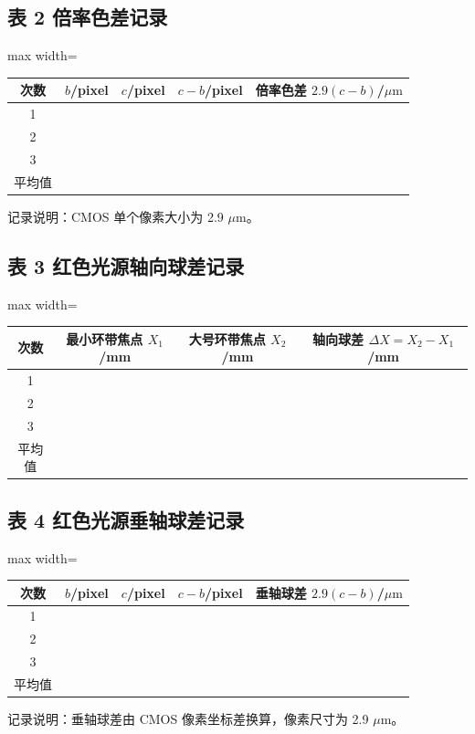 \documentclass[12pt, a4paper]{article}
\begin{document}
\subsection*{表 2 \quad 倍率色差记录}
\begin{table}[H]
  \centering
  \begin{adjustbox}{max width=\textwidth}
    \begin{tabular}{ccccc}
      \toprule
      次数 & $b$/pixel & $c$/pixel & $c-b$/pixel & 倍率色差 $2.9(c-b)$/$\mu\mathrm{m}$ \\
      \midrule
      1 & & & & \\
      2 & & & & \\
      3 & & & & \\
      \midrule
      平均值 & & & & \\
      \bottomrule
    \end{tabular}
  \end{adjustbox}
\end{table}
{\footnotesize 记录说明：CMOS 单个像素大小为 2.9 $\mu\mathrm{m}$。}

\subsection*{表 3 \quad 红色光源轴向球差记录}
\begin{table}[H]
  \centering
  \begin{adjustbox}{max width=\textwidth}
    \begin{tabular}{cccc}
      \toprule
      次数 & 最小环带焦点 $X_1$/mm & 大号环带焦点 $X_2$/mm & 轴向球差 $\Delta X=X_2-X_1$/mm \\
      \midrule
      1 & & & \\
      2 & & & \\
      3 & & & \\
      \midrule
      平均值 & & & \\
      \bottomrule
    \end{tabular}
  \end{adjustbox}
\end{table}

\subsection*{表 4 \quad 红色光源垂轴球差记录}
\begin{table}[H]
  \centering
  \begin{adjustbox}{max width=\textwidth}
    \begin{tabular}{ccccc}
      \toprule
      次数 & $b$/pixel & $c$/pixel & $c-b$/pixel & 垂轴球差 $2.9(c-b)$/$\mu\mathrm{m}$ \\
      \midrule
      1 & & & & \\
      2 & & & & \\
      3 & & & & \\
      \midrule
      平均值 & & & & \\
      \bottomrule
    \end{tabular}
  \end{adjustbox}
\end{table}
{\footnotesize 记录说明：垂轴球差由 CMOS 像素坐标差换算，像素尺寸为 2.9 $\mu\mathrm{m}$。}
\end{document}

